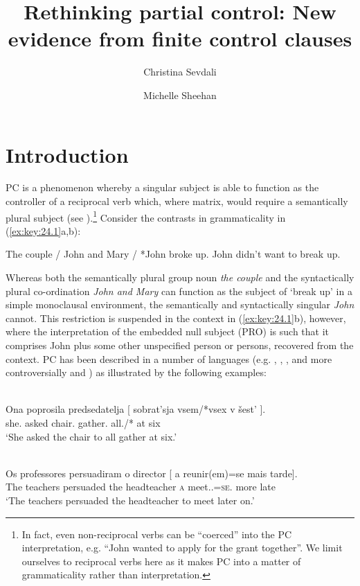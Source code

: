 \documentclass[output=paper]{langsci/langscibook}
\author{Christina Sevdali\affiliation{Ulster University}\and Michelle Sheehan\affiliation{Anglia Ruskin University}}
\title{Rethinking partial control: New evidence from finite control clauses}
\begin{document}
\glsresetall

\section{Introduction}\label{sec:key:24.1}

\Gls{PC} is a
phenomenon whereby a singular subject is able to function as the controller of
a reciprocal verb which, where matrix, would require a semantically plural
subject (see \citealt{Landau2000}).\footnote{In fact, even non-reciprocal verbs
    can be “coerced” into the \gls{PC}
    interpretation, e.g. “John wanted to apply for the grant together”. We limit
    ourselves to reciprocal verbs here as it makes \gls{PC} into a matter of grammaticality rather than interpretation.} Consider
the contrasts in grammaticality in (\ref{ex:key:24.1}a,b):\largerpage[1]

\ea\label{ex:key:24.1}
	\ea The couple / John and Mary / *John broke up.
	\ex John didn’t want to break up.
	\z
\z

Whereas both the semantically plural group noun \emph{the couple} and the
syntactically plural co-ordination \emph{John and Mary} can function as the
subject of ‘break up’ in a simple monoclausal environment, the semantically and
syntactically singular \emph{John} cannot. This restriction is suspended in
the  context in (\ref{ex:key:24.1}b), however, where the interpretation of the embedded
null subject (PRO) is such that it comprises John plus some other unspecified
person or persons, recovered from the context. \gls{PC} has been described in a number of languages (e.g. ,
, ,  and more
controversially  and ) as
illustrated by the following examples:

\ea\label{ex:key:24.2}  \parencite[909]{Landau2008}\\
	\gll    Ona   poprosila   predsedatelja [ sobrat’sja   vsem/*vsex   v šest’ ].\\
    she.\Nom{}   asked  chair.\Acc{} {} gather.\Inf{}   all.\Dat{}/*\Acc{}  at six\\
	\glt    ‘She asked the chair to all gather at six.’
\z

\ea\label{ex:key:24.3}  \parencite[34]{Sheehan2018b}\\
	\gll Os professores   persuadiram   o director  [ a    reunir(em)=se     mais tarde].\\
    The teachers   persuaded   the headteacher {} \textsc{a} meet.\Inf{}.\Tpl=\textsc{se}.\Third{}   more late\\
	\glt ‘The teachers persuaded the headteacher to meet later on.’
\z
\end{document}

